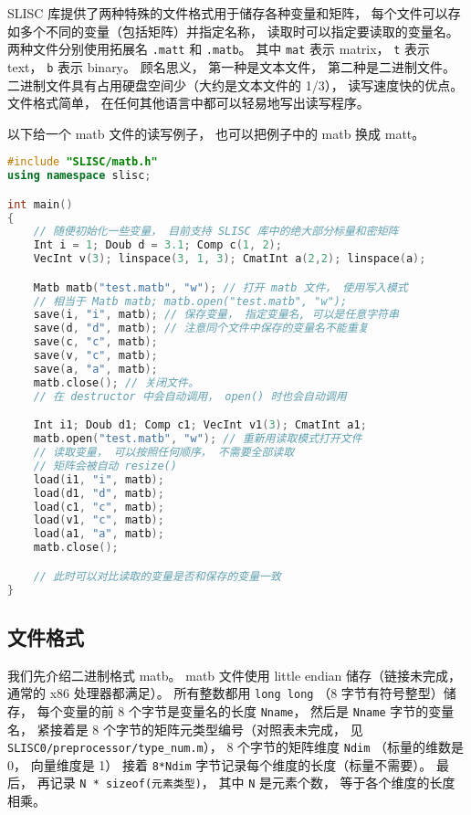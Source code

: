 
\begin{issues}
\issueTODO
\end{issues}


SLISC 库提供了两种特殊的文件格式用于储存各种变量和矩阵， 每个文件可以存如多个不同的变量（包括矩阵）并指定名称， 读取时可以指定要读取的变量名。 两种文件分别使用拓展名 \verb|.matt| 和 \verb|.matb|。 其中 \verb|mat| 表示 matrix， \verb|t| 表示 text， \verb|b| 表示 binary。 顾名思义， 第一种是文本文件， 第二种是二进制文件。 二进制文件具有占用硬盘空间少（大约是文本文件的 1/3）， 读写速度快的优点。 文件格式简单， 在任何其他语言中都可以轻易地写出读写程序。

以下给一个 matb 文件的读写例子， 也可以把例子中的 matb 换成 matt。

\begin{lstlisting}[language=cpp]
#include "SLISC/matb.h"
using namespace slisc;

int main()
{
    // 随便初始化一些变量， 目前支持 SLISC 库中的绝大部分标量和密矩阵
    Int i = 1; Doub d = 3.1; Comp c(1, 2);
    VecInt v(3); linspace(3, 1, 3); CmatInt a(2,2); linspace(a);

    Matb matb("test.matb", "w"); // 打开 matb 文件， 使用写入模式
    // 相当于 Matb matb; matb.open("test.matb", "w");
    save(i, "i", matb); // 保存变量， 指定变量名, 可以是任意字符串
    save(d, "d", matb); // 注意同个文件中保存的变量名不能重复
    save(c, "c", matb);
    save(v, "c", matb);
    save(a, "a", matb);
    matb.close(); // 关闭文件。
    // 在 destructor 中会自动调用， open() 时也会自动调用

    Int i1; Doub d1; Comp c1; VecInt v1(3); CmatInt a1;
    matb.open("test.matb", "w"); // 重新用读取模式打开文件
    // 读取变量， 可以按照任何顺序， 不需要全部读取
    // 矩阵会被自动 resize()
    load(i1, "i", matb); 
    load(d1, "d", matb);
    load(c1, "c", matb);
    load(v1, "c", matb);
    load(a1, "a", matb);
    matb.close();

    // 此时可以对比读取的变量是否和保存的变量一致
}
\end{lstlisting}

\subsection{文件格式}
我们先介绍二进制格式 matb。 matb 文件使用 little endian 储存（链接未完成， 通常的 x86 处理器都满足）。 所有整数都用 \verb|long long| （8 字节有符号整型）储存，  每个变量的前 8 个字节是变量名的长度 \verb|Nname|， 然后是 \verb|Nname| 字节的变量名， 紧接着是 8 个字节的矩阵元类型编号（对照表未完成， 见 \verb|SLISC0/preprocessor/type_num.m|）， 8 个字节的矩阵维度 \verb|Ndim| （标量的维数是 0， 向量维度是 1） 接着 \verb|8*Ndim| 字节记录每个维度的长度（标量不需要）。 最后， 再记录 \verb|N * sizeof(元素类型)|， 其中 \verb|N| 是元素个数， 等于各个维度的长度相乘。

